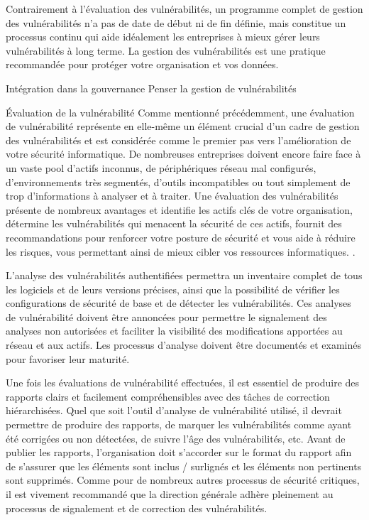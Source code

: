 

Contrairement à l’évaluation des vulnérabilités, un programme complet de gestion des vulnérabilités n’a pas de date de début ni de fin définie, mais constitue un processus continu qui aide idéalement les entreprises à mieux gérer leurs vulnérabilités à long terme.
La gestion des vulnérabilités est une pratique recommandée pour protéger votre organisation et vos données.

	Intégration dans la gouvernance
	Penser la gestion de vulnérabilités 
	
	
Évaluation de la vulnérabilité
Comme mentionné précédemment, une évaluation de vulnérabilité représente en elle-même un élément crucial d'un cadre de gestion des vulnérabilités et est considérée comme le premier pas vers l'amélioration de votre sécurité informatique. De nombreuses entreprises doivent encore faire face à un vaste pool d’actifs inconnus, de périphériques réseau mal configurés, d’environnements très segmentés, d’outils incompatibles ou tout simplement de trop d’informations à analyser et à traiter. Une évaluation des vulnérabilités présente de nombreux avantages et identifie les actifs clés de votre organisation, détermine les vulnérabilités qui menacent la sécurité de ces actifs, fournit des recommandations pour renforcer votre posture de sécurité et vous aide à réduire les risques, vous permettant ainsi de mieux cibler vos ressources informatiques. .

L'analyse des vulnérabilités authentifiées permettra un inventaire complet de tous les logiciels et de leurs versions précises, ainsi que la possibilité de vérifier les configurations de sécurité de base et de détecter les vulnérabilités. Ces analyses de vulnérabilité doivent être annoncées pour permettre le signalement des analyses non autorisées et faciliter la visibilité des modifications apportées au réseau et aux actifs. Les processus d'analyse doivent être documentés et examinés pour favoriser leur maturité.

Une fois les évaluations de vulnérabilité effectuées, il est essentiel de produire des rapports clairs et facilement compréhensibles avec des tâches de correction hiérarchisées. Quel que soit l’outil d’analyse de vulnérabilité utilisé, il devrait permettre de produire des rapports, de marquer les vulnérabilités comme ayant été corrigées ou non détectées, de suivre l’âge des vulnérabilités, etc. Avant de publier les rapports, l’organisation doit s’accorder sur le format du rapport afin de s’assurer que les éléments sont inclus / surlignés et les éléments non pertinents sont supprimés. Comme pour de nombreux autres processus de sécurité critiques, il est vivement recommandé que la direction générale adhère pleinement au processus de signalement et de correction des vulnérabilités.


